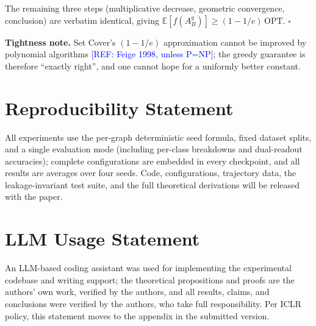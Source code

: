 \documentclass{article}
\newcommand{\refadd}[1]{\textcolor{blue}{[REF: #1]}}
\providecommand{\qed}{\hfill$\square$}
\begin{document}
The remaining three steps (multiplicative decrease, geometric convergence, conclusion) are verbatim identical, giving $\mathbb E[f(A^{g}_B)]\ge(1-1/e)\,\mathrm{OPT}$. \qed{}

\textbf{Tightness note.} Set Cover's $(1-1/e)$ approximation cannot be improved by polynomial algorithms \refadd{Feige 1998, unless P=NP}; the greedy guarantee is therefore ``exactly right'', and one cannot hope for a uniformly better constant.

\section*{Reproducibility Statement}

All experiments use the per-graph deterministic seed formula, fixed dataset splits, and a single evaluation mode (including per-class breakdowns and dual-readout accuracies); complete configurations are embedded in every checkpoint, and all results are averages over four seeds. Code, configurations, trajectory data, the leakage-invariant test suite, and the full theoretical derivations will be released with the paper.

\section*{LLM Usage Statement}

An LLM-based coding assistant was used for implementing the experimental codebase and writing support; the theoretical propositions and proofs are the authors' own work, verified by the authors, and all results, claims, and conclusions were verified by the authors, who take full responsibility. Per ICLR policy, this statement moves to the appendix in the submitted version.
\end{document}
